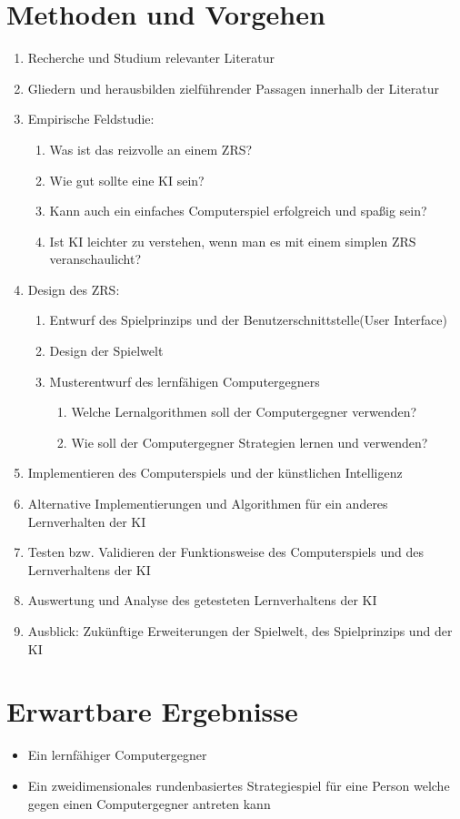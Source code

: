 \documentclass[12pt,a4paper]{article}
\begin{document}
\section*{Methoden und Vorgehen}
\begin{enumerate}
	\item Recherche und Studium relevanter Literatur
	\item Gliedern und herausbilden zielführender Passagen innerhalb der Literatur
	\item Empirische Feldstudie: 
	\begin{enumerate}
		\item Was ist das reizvolle an einem ZRS?
		\item Wie gut sollte eine KI sein?
		\item Kann auch ein einfaches Computerspiel erfolgreich und spaßig sein?
		\item Ist KI leichter zu verstehen, wenn man es mit einem simplen ZRS veranschaulicht?
	\end{enumerate}	 
	\item Design des ZRS:
	\begin{enumerate}
		\item Entwurf des Spielprinzips und der Benutzerschnittstelle(User Interface)
		\item Design der Spielwelt
		\item Musterentwurf des lernfähigen Computergegners
		\begin{enumerate}
			\item Welche Lernalgorithmen soll der Computergegner verwenden?
			\item Wie soll der Computergegner Strategien lernen und verwenden?
		\end{enumerate}
	\end{enumerate}
	\item Implementieren des Computerspiels und der künstlichen Intelligenz
	\item Alternative Implementierungen und Algorithmen für ein anderes Lernverhalten der KI
	\item Testen bzw. Validieren der Funktionsweise des Computerspiels und des Lernverhaltens der KI
	\item Auswertung und Analyse des getesteten Lernverhaltens der KI
	\item Ausblick: Zukünftige Erweiterungen der Spielwelt, des Spielprinzips und der KI
\end{enumerate}
\section*{Erwartbare Ergebnisse}
\begin{itemize}
	\item Ein lernfähiger Computergegner
	\item Ein zweidimensionales rundenbasiertes Strategiespiel für eine Person welche gegen einen Computergegner antreten kann 
\end{itemize}
\end{document}
